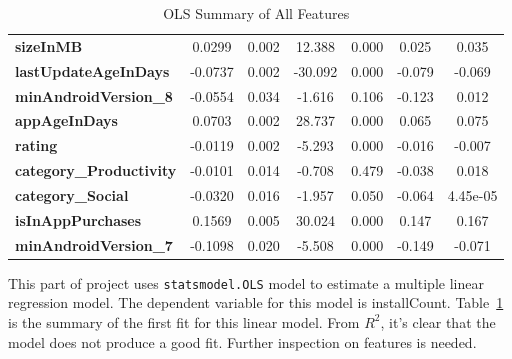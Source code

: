 \begin{center}
\begin{table}
\begin{tabular}{lcccccc}
\textbf{sizeInMB}               &       0.0299  &        0.002     &    12.388  &         0.000        &        0.025    &        0.035     \\
\textbf{lastUpdateAgeInDays}    &      -0.0737  &        0.002     &   -30.092  &         0.000        &       -0.079    &       -0.069     \\
\textbf{minAndroidVersion\_8}   &      -0.0554  &        0.034     &    -1.616  &         0.106        &       -0.123    &        0.012     \\
\textbf{appAgeInDays}           &       0.0703  &        0.002     &    28.737  &         0.000        &        0.065    &        0.075     \\
\textbf{rating}                 &      -0.0119  &        0.002     &    -5.293  &         0.000        &       -0.016    &       -0.007     \\
\textbf{category\_Productivity} &      -0.0101  &        0.014     &    -0.708  &         0.479        &       -0.038    &        0.018     \\
\textbf{category\_Social}       &      -0.0320  &        0.016     &    -1.957  &         0.050        &       -0.064    &     4.45e-05     \\
\textbf{isInAppPurchases}       &       0.1569  &        0.005     &    30.024  &         0.000        &        0.147    &        0.167     \\
\textbf{minAndroidVersion\_7}   &      -0.1098  &        0.020     &    -5.508  &         0.000        &       -0.149    &       -0.071     \\
\bottomrule
\end{tabular}
\caption{OLS Summary of All Features}
\label{tab:ols-1}
\end{table}
\end{center}


This part of project uses \texttt{statsmodel.OLS} model to estimate a multiple linear regression model. The dependent variable for this model is installCount. Table~\ref{tab:ols-1} is the summary of the first fit for this linear model. From $R^2$, it's clear that the model does not produce a good fit. Further inspection on features is needed. 

